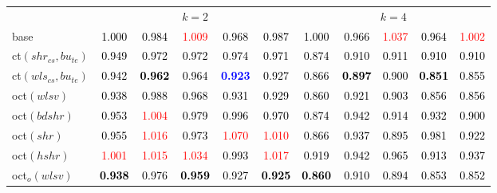 \begin{tabular}[t]{l|>{}cccc>{}c|ccccc}
\multicolumn{1}{c}{} & \multicolumn{5}{c}{\textbf{$k = 2$}} & \multicolumn{5}{c}{\textbf{$k = 4$}}\\
base & \textcolor{black}{1.000} & \textcolor{black}{0.984} & \textcolor{red}{1.009} & \textcolor{black}{0.968} & \textcolor{black}{0.987} & \textcolor{black}{1.000} & \textcolor{black}{0.966} & \textcolor{red}{1.037} & \textcolor{black}{0.964} & \textcolor{red}{1.002}\\
ct$(shr_{cs}, bu_{te})$ & \textcolor{black}{0.949} & \textcolor{black}{0.972} & \textcolor{black}{0.972} & \textcolor{black}{0.974} & \textcolor{black}{0.971} & \textcolor{black}{0.874} & \textcolor{black}{0.910} & \textcolor{black}{0.911} & \textcolor{black}{0.910} & \textcolor{black}{0.910}\\
ct$(wls_{cs}, bu_{te})$ & \textcolor{black}{0.942} & \textcolor{black}{\textbf{0.962}} & \textcolor{black}{0.964} & \textcolor{blue}{\textbf{0.923}} & \textcolor{black}{0.927} & \textcolor{black}{0.866} & \textcolor{black}{\textbf{0.897}} & \textcolor{black}{0.900} & \textcolor{black}{\textbf{0.851}} & \textcolor{black}{0.855}\\
oct$(wlsv)$ & \textcolor{black}{0.938} & \textcolor{black}{0.988} & \textcolor{black}{0.968} & \textcolor{black}{0.931} & \textcolor{black}{0.929} & \textcolor{black}{0.860} & \textcolor{black}{0.921} & \textcolor{black}{0.903} & \textcolor{black}{0.856} & \textcolor{black}{0.856}\\
oct$(bdshr)$ & \textcolor{black}{0.953} & \textcolor{red}{1.004} & \textcolor{black}{0.979} & \textcolor{black}{0.996} & \textcolor{black}{0.970} & \textcolor{black}{0.874} & \textcolor{black}{0.942} & \textcolor{black}{0.914} & \textcolor{black}{0.932} & \textcolor{black}{0.900}\\
oct$(shr)$ & \textcolor{black}{0.955} & \textcolor{red}{1.016} & \textcolor{black}{0.973} & \textcolor{red}{1.070} & \textcolor{red}{1.010} & \textcolor{black}{0.866} & \textcolor{black}{0.937} & \textcolor{black}{0.895} & \textcolor{black}{0.981} & \textcolor{black}{0.922}\\
oct$(hshr)$ & \textcolor{red}{1.001} & \textcolor{red}{1.015} & \textcolor{red}{1.034} & \textcolor{black}{0.993} & \textcolor{red}{1.017} & \textcolor{black}{0.919} & \textcolor{black}{0.942} & \textcolor{black}{0.965} & \textcolor{black}{0.913} & \textcolor{black}{0.937}\\
oct$_o(wlsv)$ & \textcolor{black}{\textbf{0.938}} & \textcolor{black}{0.976} & \textcolor{black}{\textbf{0.959}} & \textcolor{black}{0.927} & \textcolor{black}{\textbf{0.925}} & \textcolor{black}{\textbf{0.860}} & \textcolor{black}{0.910} & \textcolor{black}{0.894} & \textcolor{black}{0.853} & \textcolor{black}{0.852}\\

\end{tabular}
